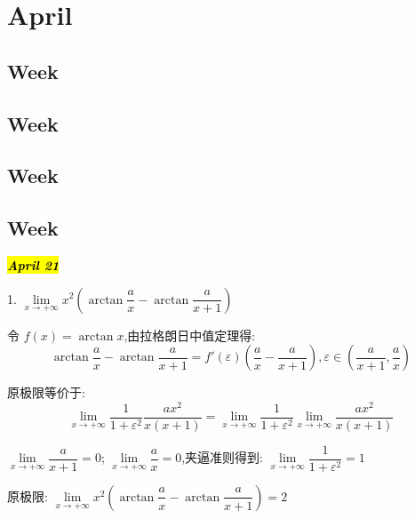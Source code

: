 \chapter{April}
\section{Week }

\section{Week }

\section{Week }

\section{Week }
\hl{\textbf{\textit{April 21}}}

1. $ \lim\limits_{x\rightarrow +\infty}x^2(\arctan \dfrac{a}{x}-\arctan \dfrac{a}{x+1})$
\begin{solution}
	
	令 $f(x)=\arctan x$,由拉格朗日中值定理得: 
	$$\arctan \frac{a}{x}-\arctan \frac{a}{x+1}=f'(\varepsilon)(\frac{a}{x}-\frac{a}{x+1}),\varepsilon\in (\frac{a}{x+1},\frac{a}{x})$$
	
	原极限等价于: 
	$$\lim\limits_{x\rightarrow +\infty}\frac{1}{1+\varepsilon^2}\frac{ax^2}{x(x+1)}=\lim\limits_{x\rightarrow +\infty}\frac{1}{1+\varepsilon^2}\lim\limits_{x\rightarrow +\infty}\frac{ax^2}{x(x+1)}$$
	
	$\lim\limits_{x\rightarrow +\infty}\dfrac{a}{x+1}=0$;
	$\lim\limits_{x\rightarrow +\infty}\dfrac{a}{x}=0$,夹逼准则得到: 
	$\lim\limits_{x\rightarrow +\infty}\dfrac{1}{1+\varepsilon^2}=1$
	
	原极限:  $ \lim\limits_{x\rightarrow +\infty}x^2(\arctan \dfrac{a}{x}-\arctan \dfrac{a}{x+1})=2$
\end{solution}


